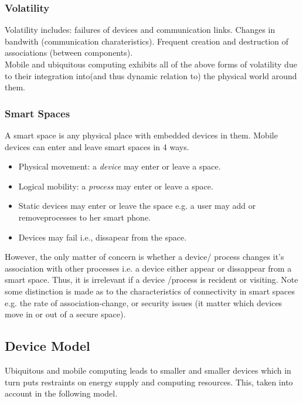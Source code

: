 \subsubsection{Volatility}
\label{volatility}
Volatility includes: failures of devices and communication links. Changes in bandwith (communication charateristics). Frequent creation and destruction of associations (between components). \\
 
Mobile and ubiquitous computing exhibits all of the above forms of volatility due to their integration into(and thus dynamic relation to) the physical world around them.\\


\subsubsection{Smart Spaces}
A smart space is any physical place with embedded devices in them. Mobile devices can enter and leave smart spaces in 4 ways.

\begin{itemize}
\item Physical movement: a \textit{device} may enter or leave a space. 
\item Logical mobility: a \textit{process} may enter or leave a space. 
\item Static devices may enter or leave the space e.g. a user may add or removeprocesses to her smart phone. 
\item Devices may fail i.e., dissapear from the space. 
\end{itemize}




However, the only matter of concern is whether a device/ process changes it's association with other processes i.e. a device either appear or dissappear from a smart space. Thus, it is irrelevant if a device /process is recident or visiting. Note some distinction is made as to the characteristics of connectivity in smart spaces e.g. the rate of association-change, or security issues (it matter which devices move in or out of a secure space). \\

\subsection{Device Model}
Ubiquitous and mobile computing leads to smaller and smaller devices which in turn puts restraints on energy supply and computing resources. This, taken into account in the following model.\\

